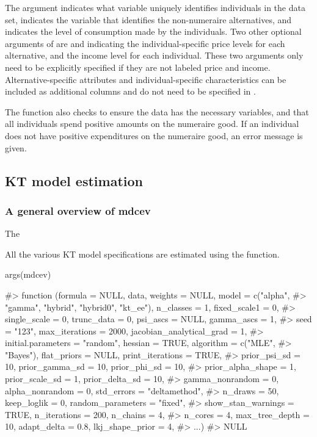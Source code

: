 The  argument indicates what variable uniquely identifies
individuals in the data set,  indicates the variable that
identifies the non-numeraire alternatives, and  indicates
the level of consumption made by the individuals. Two other optional
arguments of  are  and 
indicating the individual-specific price levels for each alternative,
and the income level for each individual. These two arguments only need
to be explicitly specified if they are not labeled price and income.
Alternative-specific attributes and individual-specific characteristics
can be included as additional columns and do not need to be specified in
.

The  function also checks to ensure the data has the
necessary variables, and that all individuals spend positive amounts on
the numeraire good. If an individual does not have positive expenditures
on the numeraire good, an error message is given.

\hypertarget{kt-model-estimation}{%
\subsection{KT model estimation}\label{kt-model-estimation}}

\hypertarget{a-general-overview-of-mdcev}{%
\subsubsection{A general overview of
mdcev}\label{a-general-overview-of-mdcev}}

The 

All the various KT model specifications are estimated using the
 function.

\begin{Schunk}
\begin{Sinput}
args(mdcev)
\end{Sinput}
\begin{Soutput}
#> function (formula = NULL, data, weights = NULL, model = c("alpha", 
#>     "gamma", "hybrid", "hybrid0", "kt_ee"), n_classes = 1, fixed_scale1 = 0, 
#>     single_scale = 0, trunc_data = 0, psi_ascs = NULL, gamma_ascs = 1, 
#>     seed = "123", max_iterations = 2000, jacobian_analytical_grad = 1, 
#>     initial.parameters = "random", hessian = TRUE, algorithm = c("MLE", 
#>         "Bayes"), flat_priors = NULL, print_iterations = TRUE, 
#>     prior_psi_sd = 10, prior_gamma_sd = 10, prior_phi_sd = 10, 
#>     prior_alpha_shape = 1, prior_scale_sd = 1, prior_delta_sd = 10, 
#>     gamma_nonrandom = 0, alpha_nonrandom = 0, std_errors = "deltamethod", 
#>     n_draws = 50, keep_loglik = 0, random_parameters = "fixed", 
#>     show_stan_warnings = TRUE, n_iterations = 200, n_chains = 4, 
#>     n_cores = 4, max_tree_depth = 10, adapt_delta = 0.8, lkj_shape_prior = 4, 
#>     ...) 
#> NULL
\end{Soutput}
\end{Schunk}

